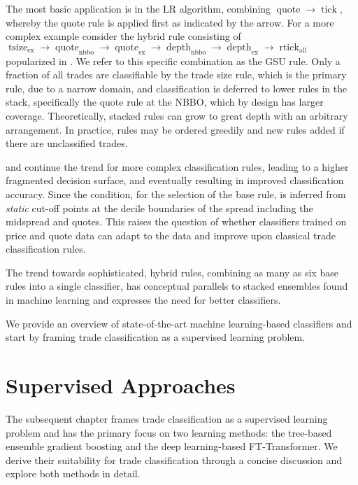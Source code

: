 The most basic application is in the \gls{LR} algorithm, combining $\operatorname{quote} \to \operatorname{tick}$, whereby the quote rule is applied first as indicated by the arrow. For a more complex example consider the hybrid rule consisting of $\operatorname{tsize}_{\mathrm{ex}} \to \operatorname{quote}_{\mathrm{nbbo}} \to \operatorname{quote}_{\mathrm{ex}} \to \operatorname{depth}_{\mathrm{nbbo}} \to \operatorname{depth}_{\mathrm{ex}} \to \operatorname{rtick}_{\mathrm{all}}$ popularized in \textcite[][18]{grauerOptionTradeClassification2022}. We refer to this specific combination as the \gls{GSU} rule. Only a fraction of all trades are classifiable by the trade size rule, which is the primary rule, due to a narrow domain, and classification is deferred to lower rules in the stack, specifically the quote rule at the \gls{NBBO}, which by design has larger coverage. Theoretically, stacked rules can grow to great depth with an arbitrary arrangement. In practice, rules may be ordered greedily and new rules added if there are unclassified trades.

\textcite[][3811]{chakrabartyTradeClassificationAlgorithms2007} and \textcite[][18]{grauerOptionTradeClassification2022} continue the trend for more complex classification rules, leading to a higher fragmented decision surface, and eventually resulting in improved classification accuracy. Since the condition, for the selection of the base rule, is inferred from \emph{static} cut-off points at the decile boundaries of the spread including the midspread and quotes. This raises the question of whether classifiers trained on price and quote data can adapt to the data and improve upon classical trade classification rules.

The trend towards sophisticated, hybrid rules, combining as many as six base rules into a single classifier, has conceptual parallels to stacked ensembles found in machine learning and expresses the need for better classifiers.

We provide an overview of state-of-the-art machine learning-based classifiers and start by framing trade classification as a supervised learning
problem.

\newpage
{}
\section{Supervised Approaches}\label{sec:supervised-approaches}

The subsequent chapter frames trade classification as a supervised learning problem and has the primary focus on two learning methods: the tree-based ensemble gradient boosting and the deep learning-based FT-Transformer. We derive their suitability for trade classification through a concise discussion and explore both methods in detail.

